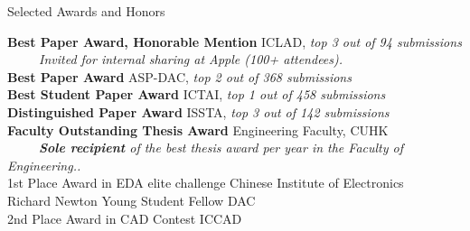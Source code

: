 \begin{rSection}{Selected Awards and Honors}
\begin{tabbing}
\textbf{Best Paper Award, Honorable Mention}  \> ICLAD, \small{\textit{top 3 out of 94 submissions}}   \\
{~ ~ ~ \small \textit{Invited for internal sharing at Apple (100+ attendees).}}\\
\textbf{Best Paper Award}                       \> ASP-DAC, \small{\textit{top 2 out of 368 submissions}}                       \\
\textbf{Best Student Paper Award }                      \> ICTAI, \small{\textit{top 1 out of 458 submissions}}                  \\
\textbf{Distinguished Paper Award}                      \>ISSTA, \small{\textit{top 3 out of 142 submissions}}                       \\
\textbf{Faculty Outstanding Thesis Award} \> Engineering Faculty, CUHK  \\
{~ ~ ~ \small \textit{\textbf{Sole recipient} of the best thesis award per year in the Faculty of Engineering..}}\\
1st Place Award in EDA elite challenge\> Chinese Institute of Electronics  \\
Richard Newton Young Student Fellow    \> DAC  \\
     2nd Place Award in CAD Contest               \> ICCAD                       
\end{tabbing}
\end{rSection}

